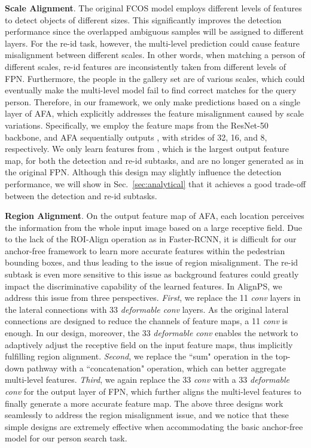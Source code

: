 \documentclass[final]{cvpr}
\begin{document}
\textbf{Scale Alignment}. The original FCOS model employs different levels of features to detect objects of different sizes. This significantly improves the detection performance since the overlapped ambiguous samples will be assigned to different layers. For the re-id task, however, the multi-level prediction could cause feature misalignment between different scales.
In other words, when matching a person of different scales, re-id features are inconsistently taken from different levels of FPN.
Furthermore, the people in the gallery set are of various scales, which could eventually make the multi-level model fail to find correct matches for the query person. Therefore, in our framework, we only make predictions based on a single layer of AFA, which explicitly addresses the feature misalignment caused by scale variations. Specifically, we employ the  feature maps from the ResNet-50 backbone, and AFA sequentially outputs , with strides of 32, 16, and 8, respectively. We only learn features from , which is the largest output feature map, for both the detection and re-id subtasks, and  are no longer generated as in the original FPN. Although this design may slightly influence the detection performance, we will show in Sec.~\ref{sec:analytical} that it achieves a good trade-off between the detection and re-id subtasks.

\textbf{Region Alignment}. On the output feature map of AFA, each location perceives the information from the whole input image based on a large receptive field. Due to the lack of the ROI-Align operation as in Faster-RCNN, it is difficult for our anchor-free framework to learn more accurate features within the pedestrian bounding boxes, and thus leading to the issue of region misalignment. The re-id subtask is even more sensitive to this issue as background features could greatly impact the discriminative capability of the learned features. In AlignPS, we address this issue from three perspectives. \emph{First}, we replace the 11 \emph{conv} layers in the lateral connections with 33 \emph{deformable conv} layers. As the original lateral connections are designed to reduce the channels of feature maps, a 11 \emph{conv} is enough. In our design, moreover, the 33 \emph{deformable conv} enables the network to adaptively adjust the receptive field on the input feature maps, thus implicitly fulfilling region alignment. \emph{Second}, we replace the ``sum" operation in the top-down pathway with a ``concatenation" operation, which can better aggregate multi-level features. \emph{Third}, we again replace the 33 \emph{conv} with a 33 \emph{deformable conv} for the output layer of FPN, which further aligns the multi-level features to finally generate a more accurate feature map. The above three designs work seamlessly to address the region misalignment issue, and we notice that these simple designs are extremely effective when accommodating the basic anchor-free model for our person search task.
\end{document}
